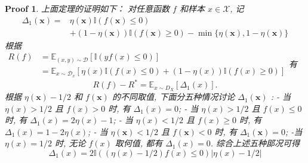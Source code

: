 \documentclass[a4paper,UTF8]{article}
\numberwithin{equation}{section}
\newtheorem*{myProof}{Proof}
\begin{document}
\begin{myProof}
		上面定理的证明如下：
		对任意函数 $f$ 和样本 $x \in \mathcal{X}$, 记
		$$
		\begin{aligned}
			\Delta_{1}(\boldsymbol{x})=& \eta(\boldsymbol{x}) \mathbb{I}(f(\boldsymbol{x}) \leqslant 0) \\
			&+(1-\eta(\boldsymbol{x})) \mathbb{I}(f(\boldsymbol{x}) \geqslant 0)-\min \{\eta(\boldsymbol{x}), 1-\eta(\boldsymbol{x})\}
		\end{aligned}
		$$
		根据 $\begin{aligned} R(f) &=\mathbb{E}_{(x, y) \sim \mathcal{D}}[\mathbb{I}(y f(x) \leqslant 0)] \\ &=\mathbb{E}_{x \sim \mathcal{D}_{x}}[\eta(x) \mathbb{I}(f(x) \leqslant 0)+(1-\eta(x)) \mathbb{I}(f(x) \geqslant 0)] \end{aligned}$有
		$$
		R(f)-R^{*}=\mathbb{E}_{x \sim D_{X}}\left[\Delta_{1}(x)\right] .
		$$
		根据 $\eta(\boldsymbol{x})-1 / 2$ 和 $f(\boldsymbol{x})$ 的不同取值, 下面分五种情况讨论 $\Delta_{1}(\boldsymbol{x})$ :
		- 当 $\eta(x)>1 / 2$ 且 $f(x)>0$ 时, 有 $\Delta_{1}(x)=0$;
		- 当 $\eta(x)>1 / 2$ 且 $f(x) \leqslant 0$ 时, 有 $\Delta_{1}(x)=2 \eta(x)-1$;
		- 当 $\eta(x)<1 / 2$ 且 $f(x) \geqslant 0$ 时, 有 $\Delta_{1}(x)=1-2 \eta(x)$;
		- 当 $\eta(\boldsymbol{x})<1 / 2$ 且 $f(\boldsymbol{x})<0$ 时, 有 $\Delta_{1}(\boldsymbol{x})=0$;
		-当 $\eta(x)=1 / 2$ 时, 无论 $f(x)$ 取何值, 都有 $\Delta_{1}(x)=0$.
		综合上述五种䢸况可得
		$$
		\Delta_{1}(x)=2 \mathbb{I}((\eta(x)-1 / 2) f(x) \leqslant 0)|\eta(x)-1 / 2|
		$$
		

\end{myProof}
\end{document}
